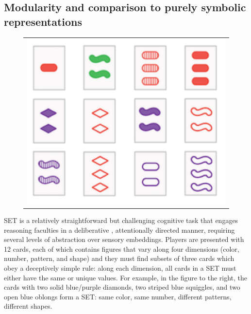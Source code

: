 \subsection{Modularity and comparison to purely symbolic representations}

%
%
%

\begin{figure}
	\begin{tabular}{c}
		\includegraphics[width=.30\textwidth]{figures/set_example}\\
	\end{tabular}
\end{figure}
SET is a relatively straightforward but challenging cognitive task that engages reasoning faculties in a deliberative
, attentionally directed manner, requiring several levels of abstraction over sensory embeddings. Players are
presented with 12 cards, each of which contains figures that vary along four dimensions (color, number, pattern, and
shape) and they must find subsets of three cards which obey a deceptively simple rule: along each dimension, all cards in a SET must either have the same or unique values. For example, in the figure to the right, the cards with two solid blue/purple diamonds, two striped blue squiggles, and two open blue oblongs form a SET: same color, same number, different patterns, different shapes.

